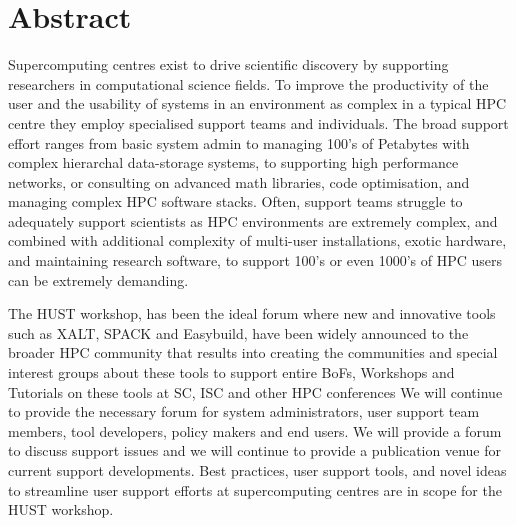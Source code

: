 \documentclass[a4paper,11pt]{article}
\begin{document}

\section*{Abstract}
\label{sec:abstract}


Supercomputing centres exist to drive scientific discovery by supporting researchers in computational science fields. 
To improve the productivity of the user and the usability of systems in an environment as complex in a typical HPC centre
they employ specialised support teams and individuals. The broad support effort ranges from basic system admin to 
managing 100's of Petabytes with complex hierarchal data-storage systems, to supporting high performance networks,  
or consulting on advanced math libraries, code optimisation, and managing complex HPC software stacks.  Often, 
support teams struggle to adequately support scientists as HPC environments are extremely complex, and combined 
with additional  complexity of multi-user installations, exotic hardware, and maintaining research software, to 
support 100's or even 1000's of HPC users can be extremely demanding.

The HUST workshop, has been the ideal forum where new and innovative tools such as XALT, SPACK and Easybuild, 
have been widely announced to the broader HPC community that results into creating the communities and special 
interest groups about these tools to support entire BoFs, Workshops and Tutorials on these tools at SC, ISC and 
other HPC conferences     We will continue to provide the necessary forum for system administrators, user support 
team members, tool developers, policy makers and end users. We will provide a forum to discuss support issues and 
we will continue to provide a publication venue for current support developments. Best practices, user support tools, 
and novel ideas to streamline user support efforts at supercomputing centres are in scope for the HUST workshop.
\end{document}
